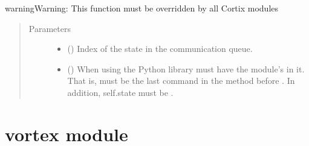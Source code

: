 \documentclass[letterpaper,10pt,openany,oneside,english]{sphinxmanual}
\begin{document}
\begin{fulllineitems}
\begin{fulllineitems}
\begin{sphinxadmonition}{warning}{Warning:}
This function must be overridden by all Cortix modules
\end{sphinxadmonition}
\begin{quote}\begin{description}
\item[{Parameters}] \leavevmode\begin{itemize}
\item {} 
\sphinxstyleliteralstrong{\sphinxupquote{{[}}}\sphinxstyleliteralstrong{\sphinxupquote{{]}}} () \textendash{} Index of the state in the communication queue.

\item {} 
\sphinxstyleliteralstrong{\sphinxupquote{{[}}}\sphinxstyleliteralstrong{\sphinxupquote{{]}}} () \textendash{} When using the Python  library  must have
the module’s  in it. That is,
 must be the last command in the
method before . In addition, self.state must be .

\end{itemize}

\end{description}\end{quote}

\end{fulllineitems}


\end{fulllineitems}



\section{vortex module}
\label{\detokenize{examples_rst/vortex:module-vortex}}\label{\detokenize{examples_rst/vortex:vortex-module}}\label{\detokenize{examples_rst/vortex::doc}}
\end{document}
